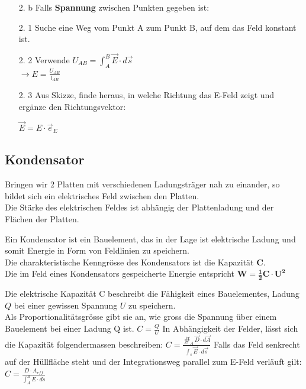 \iend
\begin{itemize}
	\item [2. b] Falls \textbf{Spannung} zwischen Punkten gegeben ist:\\

\end{itemize}
\beginip
\begin{itemize}

	\item [2. 1]  Suche eine Weg vom Punkt A zum Punkt B, auf dem das Feld konstant ist. \\

	\item [2. 2] Verwende $\displaystyle U_{AB} = \int_A^B \vec{E}\cdot d\vec{s}$ \\
	      $\displaystyle \rightarrow E = \frac{U_{AB}}{l_{AB}}$

	\item [2. 3] Aus Skizze, finde heraus, in welche Richtung das E-Feld zeigt und ergänze den Richtungsvektor:
	      \begin{center}
	      	$\vec{E} = E \cdot \vec{e}_E$
	      \end{center}
\end{itemize}
\iend
\iend


\newpage
\subsection{Kondensator}

Bringen wir 2 Platten mit verschiedenen Ladungsträger nah zu einander, so bildet sich ein elektrisches Feld zwischen den Platten. \\
Die Stärke des elektrischen Feldes ist abhängig der Plattenladung und der Flächen der Platten.

\fix
\fix
\fix
{}
\beginip
Ein Kondensator ist ein Bauelement, das in der Lage ist elektrische Ladung und somit Energie in Form von Feldlinien zu speichern. \\
Die charakteristische Kenngrösse des Kondensators ist die Kapazität \textbf{C}. \\
Die im Feld eines Kondensators gespeicherte Energie entspricht $\mathbf{W = \frac{1}{2} C \cdot U^2}$ \\
\iend



\fix
\fix
\fix
{}
\beginip
Die elektrische Kapazität C beschreibt die Fähigkeit eines Bauelementes, Ladung $Q$ bei einer gewissen Spannung $U$ zu speichern. \\
Als Proportionalitätsgrösse gibt sie an, wie gross die Spannung über einem Bauelement bei einer Ladung Q ist.
\formulaBegin
$C =\displaystyle \frac{Q}{U}$
\formulaEnd
In Abhängigkeit der Felder, lässt sich die Kapazität folgendermassen beschreiben:
\formulaBegin
$ C = \displaystyle \frac{\oiint_A \vec{D} \cdot d \vec{A} }{ \int_s \vec{E} \cdot d\vec{s}}$
\formulaEnd
Falls das Feld senkrecht auf der Hüllfläche steht und der Integrationsweg parallel zum E-Feld verläuft gilt:
\formulaBegin
$ C= \displaystyle \frac{D \cdot A_{eff} } {\int_A^B E \cdot ds} $
\formulaEnd
\iend


